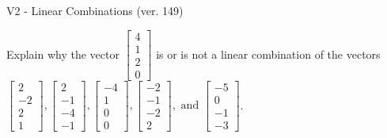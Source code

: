 \begin{exercise}
  \begin{exerciseTitle}V2 - Linear Combinations (ver. 149)\end{exerciseTitle}
  \begin{exerciseStatement}
    Explain why the vector \(\left[\begin{array}{c}
4 \\
1 \\
2 \\
0
\end{array}\right]\)  is or is not a linear 
	combination of the vectors \(\left[\begin{array}{c}
2 \\
-2 \\
2 \\
1
\end{array}\right] , \left[\begin{array}{c}
2 \\
-1 \\
-4 \\
-1
\end{array}\right] , \left[\begin{array}{c}
-4 \\
1 \\
0 \\
0
\end{array}\right] , \left[\begin{array}{c}
-2 \\
-1 \\
-2 \\
2
\end{array}\right] , \text{ and } \left[\begin{array}{c}
-5 \\
0 \\
-1 \\
-3
\end{array}\right]\).
	



\end{exerciseStatement}
\end{exercise}
